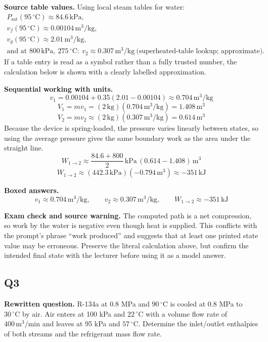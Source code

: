 \textbf{Source table values.} Using local steam tables for water:
\[
\begin{array}{l}
P_{\text{sat}}(95\,^\circ\mathrm{C}) \approx 84.6\,\mathrm{kPa},\\
v_f(95\,^\circ\mathrm{C}) \approx 0.00104\,\mathrm{m^3/kg},\\
v_g(95\,^\circ\mathrm{C}) \approx 2.01\,\mathrm{m^3/kg},\\
\text{and at } 800\,\mathrm{kPa},\ 275\,^\circ\mathrm{C}:\ v_2\approx 0.307\,\mathrm{m^3/kg}\ \text{(superheated-table lookup; approximate)}.
\end{array}
\]
If a table entry is read as a symbol rather than a fully trusted number, the calculation below is shown with a clearly labelled approximation.

\textbf{Sequential working with units.}
\[
 v_1 = 0.00104 + 0.35(2.01-0.00104) \approx 0.704\,\mathrm{m^3/kg}
\]
\[
 V_1 = mv_1 = (2\,\mathrm{kg})(0.704\,\mathrm{m^3/kg}) = 1.408\,\mathrm{m^3}
\]
\[
 V_2 = mv_2 \approx (2\,\mathrm{kg})(0.307\,\mathrm{m^3/kg}) = 0.614\,\mathrm{m^3}
\]
Because the device is spring-loaded, the pressure varies linearly between states, so using the average pressure gives the same boundary work as the area under the straight line.
\[
W_{1\to2} \approx \frac{84.6+800}{2}\,\mathrm{kPa}\,(0.614-1.408)\,\mathrm{m^3}
\]
\[
W_{1\to2} \approx (442.3\,\mathrm{kPa})(-0.794\,\mathrm{m^3}) \approx -351\,\mathrm{kJ}
\]

\textbf{Boxed answers.}
\[
\boxed{v_1\approx 0.704\,\mathrm{m^3/kg},\qquad v_2\approx 0.307\,\mathrm{m^3/kg},\qquad W_{1\to2}\approx -351\,\mathrm{kJ}}
\]

\textbf{Exam check and source warning.} The computed path is a net compression, so work by the water is negative even though heat is supplied. This conflicts with the prompt's phrase ``work produced'' and suggests that at least one printed state value may be erroneous. Preserve the literal calculation above, but confirm the intended final state with the lecturer before using it as a model answer.

\subsection*{Q3}
\textbf{Rewritten question.} R-134a at 0.8 MPa and $90\,^\circ\mathrm{C}$ is cooled at 0.8 MPa to $30\,^\circ\mathrm{C}$ by air. Air enters at 100 kPa and $22\,^\circ\mathrm{C}$ with a volume flow rate of $400\,\mathrm{m^3/min}$ and leaves at 95 kPa and $57\,^\circ\mathrm{C}$. Determine the inlet/outlet enthalpies of both streams and the refrigerant mass flow rate.

